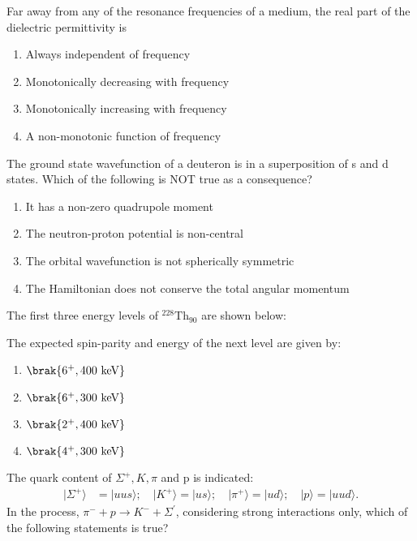 \item Far away from any of the resonance frequencies of a medium, the real part of the dielectric permittivity is
\begin{enumerate}
\item Always independent of frequency
\item Monotonically decreasing with frequency
\item Monotonically increasing with frequency
\item A non-monotonic function of frequency
\end{enumerate}

\item The ground state wavefunction of a deuteron is in a superposition of s and d states. Which of the following is NOT true as a consequence?
\begin{enumerate}
\item It has a non-zero quadrupole moment
\item The neutron-proton potential is non-central
\item The orbital wavefunction is not spherically symmetric
\item The Hamiltonian does not conserve the total angular momentum
\end{enumerate}

\item The first three energy levels of $^{228}\text{Th}_{90}$ are shown below:


The expected spin-parity and energy of the next level are given by:
\begin{multicols}{2}
\begin{enumerate}
\item $\brak{6^+, 400 \text{ keV}}$
\item $\brak{6^+, 300 \text{ keV}}$
\item $\brak{2^+, 400 \text{ keV}}$
\item $\brak{4^+, 300 \text{ keV}}$
\end{enumerate} 
\end{multicols}

\item The quark content of $\Sigma^+, K, \pi$ and p is indicated:
\begin{align*}
|\Sigma^+\rangle &= |uus\rangle; \quad |K^+\rangle = |us\rangle; \quad |\pi^+\rangle = |ud\rangle; \quad |p\rangle = |uud\rangle.
\end{align*}
In the process, $\pi^{-} + p \rightarrow K^{-} + \Sigma^{\prime}$, considering strong interactions only, which of the following statements is true?

